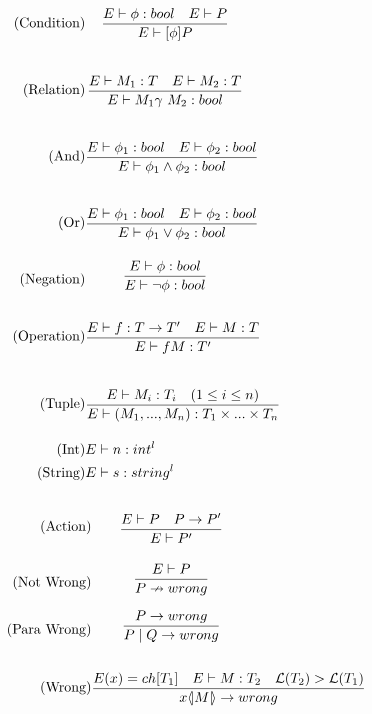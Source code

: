 \begin{align*}
\tag{Condition} &\infrule{E\vdash \phi:bool\quad E\vdash P}{E \vdash [\phi] P}\\
\tag{Relation} &\infrule{E\vdash M_1:T \quad E\vdash M_2:T}{E\vdash M_1 \gamma\ M_2:bool}\\
\tag{And} &\infrule{E\vdash \phi _1:bool \quad E\vdash \phi _2:bool}{E\vdash \phi _1 \land \phi _2:bool}\\
\tag{Or} &\infrule{E\vdash \phi _1:bool \quad E\vdash \phi _2:bool}{E\vdash \phi _1 \lor \phi _2:bool}\\
\tag{Negation} &\infrule{E\vdash \phi :bool }{E\vdash \neg \phi :bool}\\
\tag{Operation} &\infrule{E\vdash f:T\ra T'\quad E\vdash M:T}{E\vdash fM:T'}\\
\tag{Tuple} &\infrule{E\vdash M_i:T_i \quad (1\leq i\leq n)}{E\vdash (M_1,...,M_n):T_1\times...\times T_n}\\
\tag{Int} &E\vdash n: int^l\\
\tag{String} &E\vdash s:string^l\\
\end{align*}



\begin{align*}
\tag{Action} & \infrule{E \vdash P \quad P\ra P'}{E\vdash P'}\\
\tag{Not Wrong}& \infrule{E \vdash P}{P \nrightarrow wrong}\\
\tag{Para Wrong}& \infrule{P \ra wrong}{P\para Q \ra wrong}\\
\tag{Wrong}& \infrule{E(x) = ch[T_1] \quad E \vdash M:T_2 \quad \level{T_2} > \level{T_1} }{\lift{x}{M} \ra wrong}
\end{align*}


